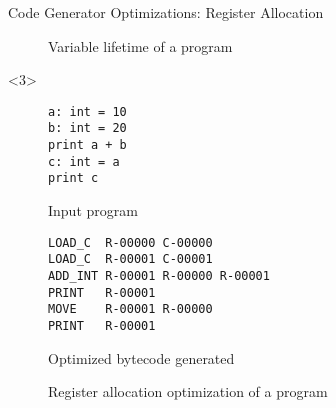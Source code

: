 \begin{frame}[fragile]{Code Generator Optimizations: Register Allocation}
\begin{onlyenv}
\begin{figure}[H]
\begin{subtable}{0.6\textwidth}
	        \end{subtable}
        \caption{Variable lifetime of a program}
        \end{figure}
    \end{onlyenv}
    \begin{onlyenv}<3>
        \begin{figure}[H]
	        \centering
            \begin{subtable}{0.3\textwidth}
                \begin{verbatim}
a: int = 10
b: int = 20
print a + b
c: int = a
print c
                \end{verbatim}
		    \caption{Input program}
	        \end{subtable}
	        \begin{subtable}{0.6\textwidth}
                \begin{verbatim}
LOAD_C  R-00000 C-00000
LOAD_C  R-00001 C-00001
ADD_INT R-00001 R-00000 R-00001
PRINT   R-00001
MOVE    R-00001 R-00000
PRINT   R-00001
                \end{verbatim}
            \caption{Optimized bytecode generated}
	        \end{subtable}
        \caption{Register allocation optimization of a program}
        \end{figure}
    \end{onlyenv}
\end{frame}
